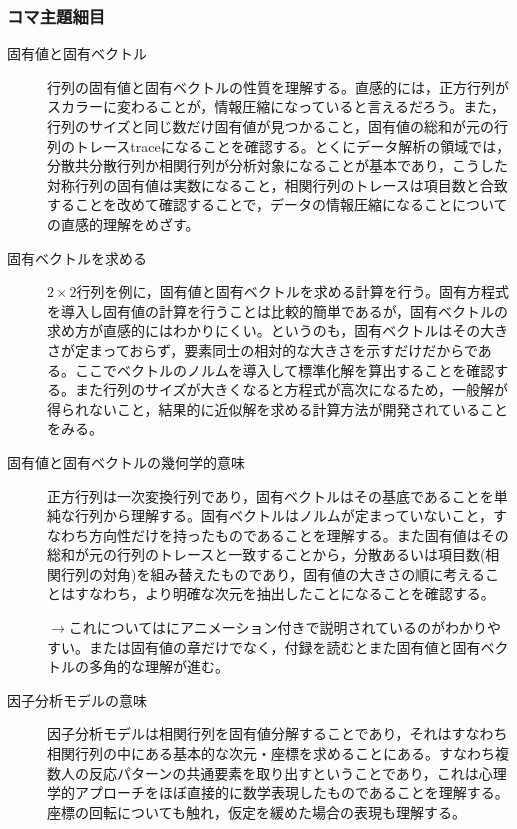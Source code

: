 \subsubsection{コマ主題細目}
\begin{description}
	\item[固有値と固有ベクトル]
	      行列の固有値と固有ベクトルの性質を理解する。直感的には，正方行列がスカラーに変わることが，情報圧縮になっていると言えるだろう。また，行列のサイズと同じ数だけ固有値が見つかること，固有値の総和が元の行列のトレースtraceになることを確認する。とくにデータ解析の領域では，分散共分散行列か相関行列が分析対象になることが基本であり，こうした対称行列の固有値は実数になること，相関行列のトレースは項目数と合致することを改めて確認することで，データの情報圧縮になることについての直感的理解をめざす。
	\item[固有ベクトルを求める]
	      $2\times2$行列を例に，固有値と固有ベクトルを求める計算を行う。固有方程式を導入し固有値の計算を行うことは比較的簡単であるが，固有ベクトルの求め方が直感的にはわかりにくい。というのも，固有ベクトルはその大きさが定まっておらず，要素同士の相対的な大きさを示すだけだからである。ここでベクトルのノルムを導入して標準化解を算出することを確認する。また行列のサイズが大きくなると方程式が高次になるため，一般解が得られないこと，結果的に近似解を求める計算方法が開発されていることをみる。
	\item[固有値と固有ベクトルの幾何学的意味]
	      正方行列は一次変換行列であり，固有ベクトルはその基底であることを単純な行列から理解する。固有ベクトルはノルムが定まっていないこと，すなわち方向性だけを持ったものであることを理解する。また固有値はその総和が元の行列のトレースと一致することから，分散あるいは項目数(相関行列の対角)を組み替えたものであり，固有値の大きさの順に考えることはすなわち，より明確な次元を抽出したことになることを確認する。

	      \begin{flushright}
		      $\to$これについては\textcite{Hiraoka20041001}にアニメーション付きで説明されているのがわかりやすい。また\textcite{Naganuma20110920}は固有値の章だけでなく，付録を読むとまた固有値と固有ベクトルの多角的な理解が進む。
	      \end{flushright}

	\item[因子分析モデルの意味]
	      因子分析モデルは相関行列を固有値分解することであり，それはすなわち相関行列の中にある基本的な次元・座標を求めることにある。すなわち複数人の反応パターンの共通要素を取り出すということであり，これは心理学的アプローチをほぼ直接的に数学表現したものであることを理解する。座標の回転についても触れ，仮定を緩めた場合の表現も理解する。
\end{description}
